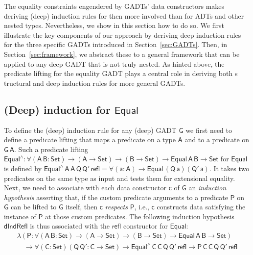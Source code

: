 \documentclass[9pt]{entcs}
\begin{document}
The equality constraints engendered by GADTs' data constructors makes
deriving (deep) induction rules for then more involved than for ADTs
and other nested types. Nevertheless, we show in this section how to
do so. We first illustrate the key components of our approach by
deriving deep induction rules for the three specific GADTs introduced
in Section~\ref{sec:GADTs}. Then, in Section~\ref{sec:framework}, we
abstract these to a general framework that can be applied to any deep
GADT that is not truly nested. As hinted above, the predicate lifting
for the equality GADT plays a central role in deriving both s
tructural and deep induction rules for more general GADTs.
 
\subsection{(Deep) induction for $\mathsf{Equal}$}\label{sec:ind-equal}

To define the (deep) induction rule for any (deep) GADT $\mathsf{G}$
we first need to define a predicate lifting that maps a predicate on a
type $\mathsf{A}$ and to a predicate on $\mathsf{G\,A}$. Such a
predicate lifting $\mathsf{Equal^{\wedge} : \forall (A\,B : Set) \to
  (A \to Set) \to (B \to Set) \to Equal\,A\,B \to Set}$ for
$\mathsf{Equal}$ is defined by
$\mathsf{Equal^{\wedge}\,A\,A\,Q\,Q'\,refl = \forall (a : A) \to
  Equal\,(Q\,a)(Q'\,a)}$.  It takes two predicates on the same type as
input and tests them for extensional equality.
%
Next, we need to associate with each data constructor $\mathsf{c}$ of
$\mathsf{G}$ an {\em induction hypothesis} asserting that, if the
custom predicate arguments to a predicate $\mathsf{P}$ on $\mathsf{G}$
can be lifted to $\mathsf{G}$ itself, then $\mathsf{c}$ {\em respects}
$\mathsf{P}$, i.e., $\mathsf{c}$ constructs data satisfying the
instance of $\mathsf{P}$ at those custom predicates. The following
induction hypothesis $\mathsf{dIndRefl}$ is thus associated with the
$\mathsf{refl}$ constructor for $\mathsf{Equal}$:
\begin{equation*}\label{eq:ind-refl}
\begin{array}{l}
\mathsf{\lambda (P : \forall (A\,B : Set) \to (A \to Set) \to (B \to
  Set) \to Equal\,A\,B \to Set)} \\ 
\quad\mathsf{\to \forall (C : Set) (Q\, Q' : C \to Set) \to
  Equal^{\wedge}\,C\,C\,Q\,Q'\,refl \to P\,C\,C\,Q\,Q'\,refl} 
\end{array}
\end{equation*}
\end{document}
